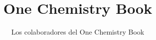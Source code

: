 \documentclass[11pt,a4paper,twoside,openany]{book}
\title{One Chemistry Book}
\author{Los colaboradores del One Chemistry Book}
\date{\bookdate}
\begin{document}
\frontmatter




\tableofcontents

\mainmatter



\appendix
\part{\omsolutionspart}


\backmatter
\renewcommand{\indexspace}{\par\vskip 8pt plus 4pt minus 4pt\relax}
\printindex
\end{document}
